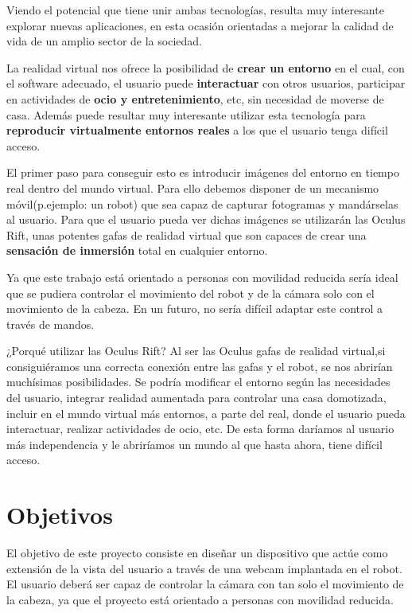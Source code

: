 \documentclass[twoside, 11pt]{epstfg}
\begin{document}
Viendo el potencial que tiene unir ambas tecnologías, resulta muy interesante explorar nuevas aplicaciones, en esta ocasión orientadas a mejorar la calidad de vida de un amplio sector de la sociedad.


La realidad virtual nos ofrece la posibilidad de \textbf{crear un entorno} en el cual, con el software adecuado, el usuario puede \textbf{interactuar} con otros usuarios, participar en actividades de \textbf{ocio y entretenimiento}, etc, sin necesidad de moverse de casa.
Además puede resultar muy interesante utilizar esta tecnología para \textbf{reproducir virtualmente entornos reales} a los que el usuario tenga difícil acceso.

El primer paso para conseguir esto es introducir imágenes del entorno en tiempo real dentro del mundo virtual. Para ello debemos disponer de un mecanismo móvil(p.ejemplo: un robot) que sea capaz de capturar fotogramas y mandárselas al usuario.  
Para que el usuario pueda ver dichas imágenes se utilizarán las Oculus Rift, unas potentes gafas de realidad virtual que son capaces de crear una \textbf{sensación de inmersión} total en cualquier entorno.

Ya que este trabajo está orientado a personas con movilidad reducida sería ideal que se pudiera controlar el movimiento del robot y de la cámara solo con el movimiento de la cabeza. En un futuro, no sería difícil adaptar este control a través de mandos.

¿Porqué utilizar las Oculus Rift?  Al ser las Oculus gafas de realidad virtual,si consiguiéramos una correcta conexión entre las gafas y el robot, se nos abrirían muchísimas posibilidades. Se podría modificar el entorno según las necesidades del usuario, integrar realidad aumentada para controlar una casa domotizada, incluir en el mundo virtual más entornos, a parte del real, donde el usuario pueda interactuar, realizar actividades de ocio, etc.
De esta forma daríamos al usuario más independencia y le abriríamos un mundo al que hasta ahora, tiene difícil acceso.

\section{Objetivos}
El objetivo de este proyecto consiste en diseñar un dispositivo que actúe como extensión de la vista del usuario a través de una webcam implantada en el robot. El usuario deberá ser capaz de controlar la cámara con tan solo el movimiento de la cabeza, ya que el proyecto está orientado a personas con movilidad reducida.
\end{document}
